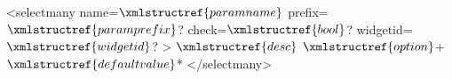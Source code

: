 <selectmany name=$\xmlstructref{paramname}$
  prefix=$\xmlstructref{paramprefix}$? check=$\xmlstructref{bool}$? widgetid=$\xmlstructref{widgetid}$? >
  $\xmlstructref{desc}$
  $\xmlstructref{option}$+
  $\xmlstructref{defaultvalue}$*
</selectmany>
